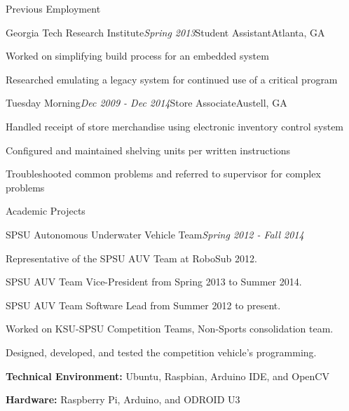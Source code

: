 \documentclass[11pt]{resume} %
\begin{document}
\begin{rSection}{Previous Employment}

\begin{rSubsection}{Georgia Tech Research Institute}{\em Spring 2013}{Student Assistant}{Atlanta, GA}
\item Worked on simplifying build process for an embedded system
\item Researched emulating a legacy system for continued use of a critical program
\end{rSubsection}

\begin{rSubsection}{Tuesday Morning}{\em Dec 2009 - Dec 2014}{Store Associate}{Austell, GA}
\item Handled receipt of store merchandise using electronic inventory control system
\item Configured and maintained shelving units per written instructions
\item Troubleshooted common problems and referred to supervisor for complex problems
\end{rSubsection}

\end{rSection}


\begin{rSection}{Academic Projects}

\begin{rSubsection}{SPSU Autonomous Underwater Vehicle Team}{\em Spring 2012 - Fall 2014}{}{}

\item Representative of the SPSU AUV Team at RoboSub 2012.
\item SPSU AUV Team Vice-President from Spring 2013 to Summer 2014.
\item SPSU AUV Team Software Lead from Summer 2012 to present.
\item Worked on KSU-SPSU Competition Teams, Non-Sports consolidation team.
\item Designed, developed, and tested the competition vehicle's programming.
\item \textbf{Technical Environment:} Ubuntu, Raspbian, Arduino IDE, and OpenCV
\item \textbf{Hardware:} Raspberry Pi, Arduino, and ODROID U3
\end{rSubsection}

\end{rSection}
\end{document}
